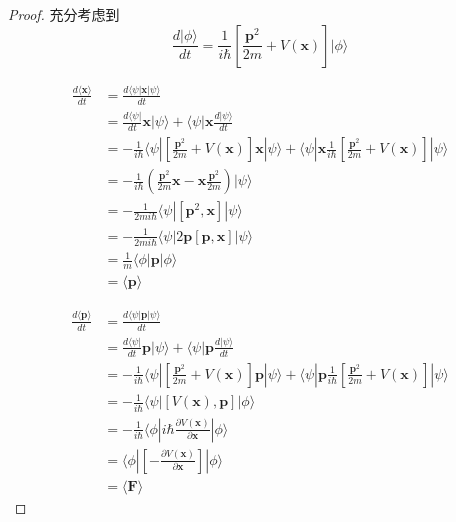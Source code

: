 \documentclass[12pt,a4paper,openany,twoside]{book}
\numberwithin{equation}{section}
\newcommand{\bra}[1]{\langle #1 |}
\newcommand{\ket}[1]{| #1 \rangle}
\newcommand{\bracketl}[3]{\langle #1 | #2 | #3 \rangle}
\newcommand{\mean}[1]{\langle #1 \rangle}
\begin{document}
  \begin{proof}
    充分考虑到
    \begin{equation}
    \frac{d\ket{\phi}}{dt}=\frac{1}{i\hbar}[\frac{\textbf{p}^2}{2m}+V(\textbf{x})]\ket{\phi}
    \end{equation}

    \begin{align*}
    \frac{d \mean{\textbf{x}}}{dt}  & = \frac{d \bracketl{\psi}{\textbf{x}}{\psi}}{dt} \\ 
    & = \frac{d\bra{\psi}}{dt} \textbf{x} \ket{\psi} + \bra{\psi} \textbf{x} \frac{d\ket{\psi}}{dt} \\
    &= - \frac{1}{i \hbar}\bra{\psi}[\frac{\textbf{p}^2}{2m}+V(\textbf{x})]\textbf{x}\ket{\psi}+ \bra{\psi}\textbf{x}\frac{1} {i\hbar}[\frac{\textbf{p}^2}{2m}+V(\textbf{x})]\ket{\psi}\\
    &= -\frac{1}{i\hbar}(\frac{\textbf{p}^2}{2m}\textbf{x}-\textbf{x}\frac{\textbf{p}^2}{2m})\ket{\psi}\\
    &= -\frac{1}{2mi\hbar}\bracketl{\psi}{[\textbf{p}^2,\textbf{x}]}{\psi}\\
    &=-\frac{1}{2mi\hbar}\bracketl{\psi}{2\textbf{p}[\textbf{p},\textbf{x}]}{\psi}\\
    &=\frac{1}{m}\bracketl{\phi}{\textbf{p}}{\phi}\\
    &=\mean{\textbf{p}}
    \end{align*}

    \begin{align*}
    \frac{d\mean{\textbf{p}}}{dt} &= \frac{d\bracketl{\psi}{\textbf{p}}{\psi}}{dt}\\
    &=\frac{d\bra{\psi}}{dt} \textbf{p} \ket{\psi} + \bra{\psi} \textbf{p} \frac{d\ket{\psi}}{dt} \\
    &= - \frac{1}{i \hbar}\bra{\psi}[\frac{\textbf{p}^2}{2m}+V(\textbf{x})]\textbf{p}\ket{\psi}+ \bra{\psi}\textbf{p}\frac{1} {i\hbar}[\frac{\textbf{p}^2}{2m}+V(\textbf{x})]\ket{\psi}\\
    &= -\frac{1}{i\hbar}\bracketl{\psi}{[V(\textbf{x}),\textbf{p}]}{\phi} \\
    & = -\frac{1}{i\hbar}\bracketl{\phi}{i\hbar\frac{\partial V(\textbf{x})}{\partial \textbf{x}}}{\phi}\\
    & = \bracketl{\phi}{[-\frac{\partial V(\textbf{x})}{\partial \textbf{x}}]}{\phi}\\
    & = \mean{\textbf{F}}
    \end{align*}


\end{proof}
\end{document}

